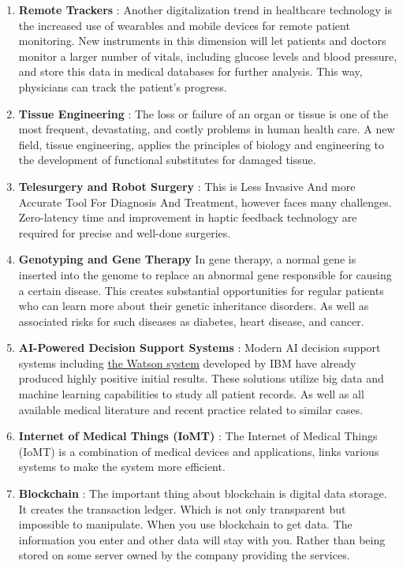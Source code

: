\documentclass[12pt]{article}
\begin{document}
\begin{enumerate}
\begin{enumerate}
 \end{enumerate}
\item \textbf{Remote Trackers} : Another digitalization trend in healthcare technology is the increased use of wearables and mobile devices for remote patient monitoring. New instruments in this dimension will let patients and doctors monitor a larger number of vitals, including glucose levels and blood pressure, and store this data in medical databases for further analysis. This way, physicians can track the patient's progress.

\item \textbf{Tissue Engineering} : The loss or failure of an organ or tissue is one of the most frequent, devastating, and costly problems in human health care. A new field, tissue engineering, applies the principles of biology and engineering to the development of functional substitutes for damaged tissue.

\item \textbf{Telesurgery and Robot Surgery} : This is Less Invasive And more Accurate Tool For Diagnosis And Treatment, however faces many challenges. Zero-latency time and improvement in haptic feedback technology are required for precise and well-done surgeries.

\item \textbf{Genotyping and Gene Therapy} In gene therapy, a normal gene is inserted into the genome to replace an abnormal gene responsible for causing a certain disease. This creates substantial opportunities for regular patients who can learn more about their genetic inheritance disorders. As well as associated risks for such diseases as diabetes, heart disease, and cancer.

\item\textbf{AI-Powered Decision Support Systems} : Modern AI decision support systems including \href{https://en.wikipedia.org/wiki/Watson_(computer)}{the Watson system} developed by IBM have already produced highly positive initial results. These solutions utilize big data and machine learning capabilities to study all patient records. As well as all available medical literature and recent practice related to similar cases.

\item \textbf{Internet of Medical Things (IoMT)} : The Internet of Medical Things (IoMT) is a combination of medical devices and applications, links various systems to make the system more efficient.

\item \textbf{Blockchain} : The important thing about blockchain is digital data storage. It creates the transaction ledger. Which is not only transparent but impossible to manipulate. When you use blockchain to get data. The information you enter and other data will stay with you. Rather than being stored on some server owned by the company providing the services.


\end{enumerate}
\end{document}
